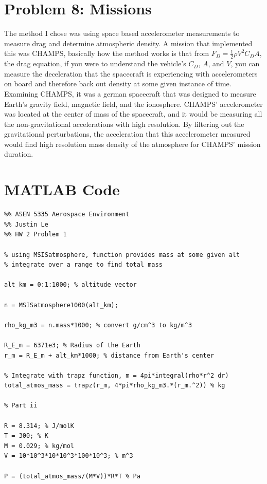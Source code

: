 \documentclass[11pt]{article}
\begin{document}
\section*{Problem 8: Missions}
\hspace*{2em} The method I chose was using space based accelerometer measurements to measure drag and determine atmospheric density.
A mission that implemented this was CHAMPS, basically how the method works is that from $F_D = \tfrac12\rho V^2 C_D A$,
the drag equation, if you were to understand the vehicle's $C_D$, $A$, and $V$, you can measure the deceleration that the 
spacecraft is experiencing with accelerometers on board and therefore back out density at some given instance of time. Examining
CHAMPS, it was a german spacecraft that was designed to measure Earth's gravity field, magnetic field, and the ionosphere. CHAMPS' 
accelerometer was located at the center of mass of the spacecraft, and it would be measuring all the non-gravitational accelerations with high resolution. 
By filtering out the gravitational perturbations, the acceleration that this accelerometer measured would find high resolution mass density of the 
atmosphere for CHAMPS' mission duration. 

\newpage
\section*{MATLAB Code}

\begin{lstlisting}
%% ASEN 5335 Aerospace Environment
%% Justin Le
%% HW 2 Problem 1

% using MSISatmosphere, function provides mass at some given alt
% integrate over a range to find total mass

alt_km = 0:1:1000; % altitude vector

n = MSISatmosphere1000(alt_km);

rho_kg_m3 = n.mass*1000; % convert g/cm^3 to kg/m^3

R_E_m = 6371e3; % Radius of the Earth
r_m = R_E_m + alt_km*1000; % distance from Earth's center

% Integrate with trapz function, m = 4pi*integral(rho*r^2 dr)
total_atmos_mass = trapz(r_m, 4*pi*rho_kg_m3.*(r_m.^2)) % kg

% Part ii

R = 8.314; % J/molK
T = 300; % K
M = 0.029; % kg/mol
V = 10*10^3*10*10^3*100*10^3; % m^3

P = (total_atmos_mass/(M*V))*R*T % Pa
\end{lstlisting}
\end{document}
